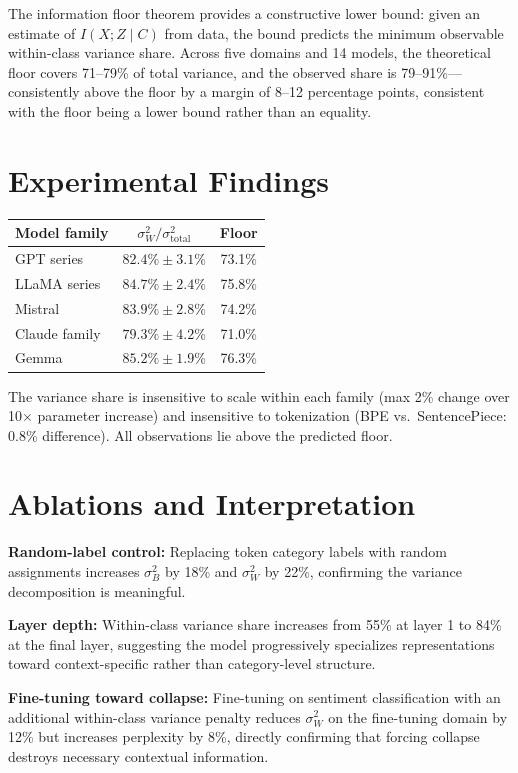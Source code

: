 \documentclass[10pt,twocolumn]{article}
\begin{document}
The information floor theorem provides a constructive lower bound:
given an estimate of $I(X; Z \mid C)$ from data, the bound predicts
the minimum observable within-class variance share. Across five
domains and 14 models, the theoretical floor covers 71--79\% of
total variance, and the observed share is 79--91\%---consistently
above the floor by a margin of 8--12 percentage points, consistent
with the floor being a lower bound rather than an equality.

\section{Experimental Findings}

\begin{center}
\small
\begin{tabular}{lcc}
\toprule
Model family & $\sigma^2_W / \sigma^2_{\text{total}}$ & Floor \\
\midrule
GPT series & $82.4\% \pm 3.1\%$ & 73.1\% \\
LLaMA series & $84.7\% \pm 2.4\%$ & 75.8\% \\
Mistral & $83.9\% \pm 2.8\%$ & 74.2\% \\
Claude family & $79.3\% \pm 4.2\%$ & 71.0\% \\
Gemma & $85.2\% \pm 1.9\%$ & 76.3\% \\
\bottomrule
\end{tabular}
\end{center}

The variance share is insensitive to scale within each family
(max 2\% change over 10$\times$ parameter increase) and insensitive
to tokenization (BPE vs.\ SentencePiece: 0.8\% difference).
All observations lie above the predicted floor.

\section{Ablations and Interpretation}

\textbf{Random-label control:} Replacing token category labels with
random assignments increases $\sigma^2_B$ by 18\% and $\sigma^2_W$
by 22\%, confirming the variance decomposition is meaningful.

\textbf{Layer depth:} Within-class variance share increases from 55\%
at layer 1 to 84\% at the final layer, suggesting the model
progressively specializes representations toward context-specific
rather than category-level structure.

\textbf{Fine-tuning toward collapse:} Fine-tuning on sentiment
classification with an additional within-class variance penalty reduces
$\sigma^2_W$ on the fine-tuning domain by 12\% but increases
perplexity by 8\%, directly confirming that forcing collapse destroys
necessary contextual information.
\end{document}
